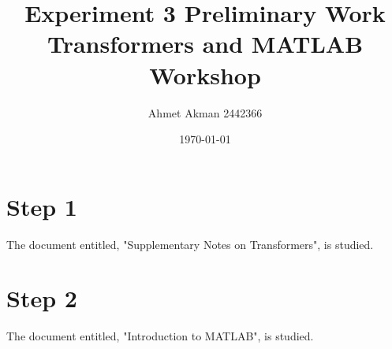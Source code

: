 \documentclass[letterpaper,12pt]{article}
\begin{document}
\title{Experiment 3 Preliminary Work \protect\\ Transformers and MATLAB Workshop}
\author{Ahmet Akman 2442366 \protect\\}
\date{\today}
\maketitle
\tableofcontents

\section{Step 1}
The document entitled,  "Supplementary Notes on Transformers", is studied.
\section{Step 2}
The document entitled,  "Introduction to MATLAB", is studied.
\end{document}
